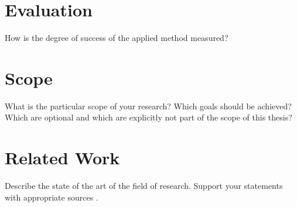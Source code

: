\documentclass[a4paper, 12pt]{article}
\begin{document}
\section{Evaluation}
How is the degree of success of the applied method measured?

\section{Scope}
What is the particular scope of your research? Which goals should be achieved?
Which are optional and which are explicitly not part of the scope of this
thesis?

\section{Related Work}
Describe the state of the art of the field of research. Support your statements
with appropriate sources \cite{fardin14}.

\clearpage

\printbibliography
\end{document}
